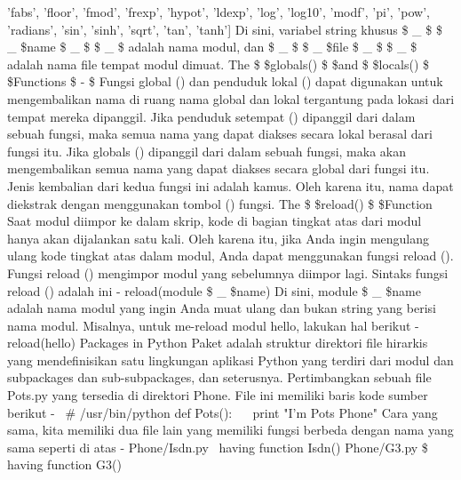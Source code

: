  \hspace*{0.5in} 'fabs', 'floor', 'fmod', 'frexp', 'hypot', 'ldexp', 'log',  
 \hspace*{0.5in} 'log10', 'modf', 'pi', 'pow', 'radians', 'sin', 'sinh',   
 \hspace*{0.5in} 'sqrt', 'tan', 'tanh']  
Di sini, variabel string khusus  \$  \_  \$ \$  \_  \$name \$  \_  \$ \$  \_  \$ adalah nama modul, dan  \$  \_  \$ \$  \_  \$file \$  \_  \$ \$  \_  \$ adalah nama file tempat modul dimuat. 
The \$  \$globals() \$  \$and \$  \$locals() \$  \$Functions  \$ - \$  
Fungsi global () dan penduduk lokal () dapat digunakan untuk mengembalikan nama di ruang nama global dan lokal tergantung pada lokasi dari tempat mereka dipanggil.  
Jika penduduk setempat () dipanggil dari dalam sebuah fungsi, maka semua nama yang dapat diakses secara lokal berasal dari fungsi itu. 
Jika globals () dipanggil dari dalam sebuah fungsi, maka akan mengembalikan semua nama yang dapat diakses secara global dari fungsi itu. 
Jenis kembalian dari kedua fungsi ini adalah kamus. Oleh karena itu, nama dapat diekstrak dengan menggunakan tombol () fungsi.
The \$  \$reload() \$  \$Function  
Saat modul diimpor ke dalam skrip, kode di bagian tingkat atas dari modul hanya akan dijalankan satu kali.  
Oleh karena itu, jika Anda ingin mengulang ulang kode tingkat atas dalam modul, Anda dapat menggunakan fungsi reload (). Fungsi reload () mengimpor modul yang sebelumnya diimpor lagi. Sintaks fungsi reload () adalah ini -  
 \hspace*{0.5in} reload(module \$  \_  \$name) 
Di sini, module \$  \_  \$name adalah nama modul yang ingin Anda muat ulang dan bukan string yang berisi nama modul. Misalnya, untuk me-reload modul hello, lakukan hal berikut -  
 \hspace*{0.5in} reload(hello) 
Packages in Python 
Paket adalah struktur direktori file hirarkis yang mendefinisikan satu lingkungan aplikasi Python yang terdiri dari modul dan subpackages dan sub-subpackages, dan seterusnya.  
Pertimbangkan sebuah file Pots.py yang tersedia di direktori Phone. File ini memiliki baris kode sumber berikut -  
 \hspace*{0.5in}  \  \#  \!/usr/bin/python 
 \hspace*{0.5in} def Pots():  
 \hspace*{0.5in} ~~ print "I'm Pots Phone"  
Cara yang sama, kita memiliki dua file lain yang memiliki fungsi berbeda dengan nama yang sama seperti di atas -  
Phone/Isdn.py \  \file having function Isdn()  
Phone/G3.py \$  \file having function G3() 
